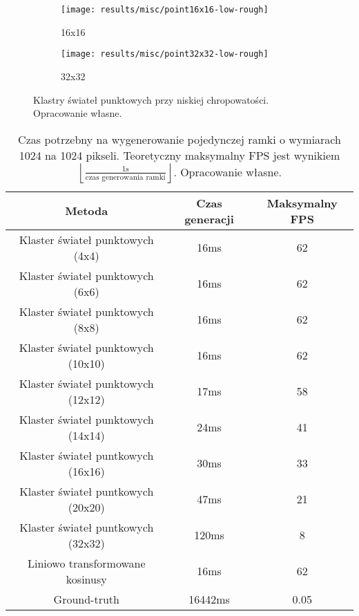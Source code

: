 \documentclass[../main.tex]{subfiles}
\begin{document}
\begin{figure}
    \centering
    \begin{subfigure}{0.45\textwidth}
        \texttt{[image: results/misc/point16x16-low-rough]}
        \caption{16x16}
    \end{subfigure}
    \begin{subfigure}{0.45\textwidth}
        \texttt{[image: results/misc/point32x32-low-rough]}
        \caption{32x32}
    \end{subfigure}
    \caption{Klastry świateł punktowych przy niskiej chropowatości. Opracowanie własne.}
    \label{fig:results:pointManyLowAlpha}
\end{figure}

\begin{table}
    \centering
    \begin{tabular}{|c|c|c|}
        \hline
        Metoda & Czas generacji & Maksymalny FPS \\ \hline
        Klaster świateł punktowych (4x4) & 16ms & 62 \\ \hline
        Klaster świateł punktowych (6x6) & 16ms & 62 \\ \hline
        Klaster świateł punktowych (8x8) & 16ms & 62 \\ \hline
        Klaster świateł punktowych (10x10) & 16ms & 62 \\ \hline
        Klaster świateł punktowych (12x12) & 17ms & 58 \\ \hline
        Klaster świateł punktowych (14x14) & 24ms & 41 \\ \hline
        Klaster świateł puntkowych (16x16) & 30ms & 33 \\ \hline
        Klaster świateł puntkowych (20x20) & 47ms & 21 \\ \hline
        Klaster świateł puntkowych (32x32) & 120ms & 8 \\ \hline
        Liniowo transformowane kosinusy & 16ms & 62 \\ \hline
        Ground-truth & 16442ms & 0.05 \\
        \hline
    \end{tabular}
    \caption{Czas potrzebny na wygenerowanie pojedynczej ramki o wymiarach 1024 na 1024 pikseli. Teoretyczny maksymalny FPS jest wynikiem $\left \lfloor \frac{1\text{s}}{\text{czas generowania ramki}}\right \rfloor$. Opracowanie własne.}
    \label{tab:performance}
\end{table}
\end{document}
